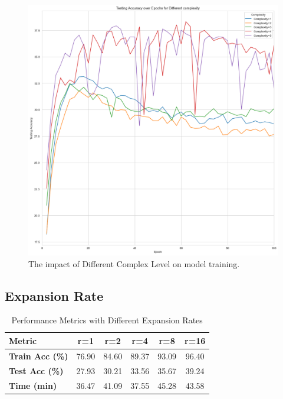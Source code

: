 \documentclass[10pt,twocolumn,letterpaper]{article}
\begin{document}
\begin{figure}[htbp]
\begin{minipage}[t]{0.33\textwidth}
   \end{minipage}
   \begin{minipage}[t]{0.33\textwidth}
      \centering
      \includegraphics[width=\textwidth]{Fig/14.png}
   \end{minipage}
   \caption{The impact of Different Complex Level on model training.}
\end{figure}

\subsection{Expansion Rate}

\begin{table}[h!]
   \centering
   \footnotesize
   \begin{tabular}{lccccc}
      \hline
      \textbf{Metric}         & \textbf{r=1} & \textbf{r=2} & \textbf{r=4} & \textbf{r=8} & \textbf{r=16} \\ \hline
      \textbf{Train Acc (\%)} & 76.90        & 84.60        & 89.37        & 93.09        & 96.40         \\
      \textbf{Test Acc (\%)}  & 27.93        & 30.21        & 33.56        & 35.67        & 39.24         \\
      \textbf{Time (min)}     & 36.47        & 41.09        & 37.55        & 45.28        & 43.58         \\ \hline
   \end{tabular}
   \caption{Performance Metrics with Different Expansion Rates}
   \label{tab:expansion_performance_transposed}
\end{table}
\end{document}
